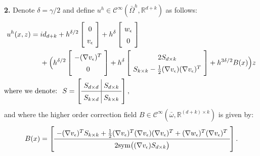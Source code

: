 \documentclass[reqno,twoside,11pt]{amsart}
\newcommand{\sym}{\mathrm{sym}}
\newcommand{\R}{\mathbb{R}}
\numberwithin{equation}{section}
\theoremstyle{plain}
\theoremstyle{definition}
\begin{document}
\medskip

{\bf 2.} Denote $\delta=\gamma/2$ and define $u^h\in \mathcal{C}^\infty(\bar \Omega^h,\R^{d+k})$ as follows: 
\begin{equation*}\label{recseq0}
\arraycolsep=3.4pt\def\arraystretch{1.4}
\begin{split}
u^h(x,z) = \; &  id_{d+k} + h^{\delta/2}\left[\begin{array}{c} 0\\
    v_\epsilon\end{array}\right] + h^{\delta}\left[\begin{array}{c} w_\epsilon\\ 0\end{array}\right] 
\\ & + \Big(h^{\delta/2} \left[\begin{array}{c} -(\nabla v_\epsilon)^T\\ 0\end{array}\right]
+ h^{\delta} \left[\begin{array}{c} 2 S_{d\times k}\\ S_{k\times
      k}-\frac{1}{2}(\nabla v_\epsilon)(\nabla v_\epsilon)^T\end{array}\right] +h^{3\delta/2} B(x)\Big)z
\\ & \hspace{-1.8cm} \mbox{where we denote: }\; 
S=\left[\begin{array}{c|c} S_{d\times  d} & S_{d\times k} 
    \\ \hline S_{k\times d} & S_{k\times k}\end{array}\right],
\end{split}
\end{equation*}
and where the higher order correction field $B\in\mathcal{C}^\infty (\bar\omega, \R^{(d+k)\times k})$ is given by:
$$\arraycolsep=3.4pt\def\arraystretch{1.4} 
B(x) = \left[\begin{array}{c} -(\nabla v_\epsilon)^TS_{k\times k}+\frac{1}{2}(\nabla
v_\epsilon)^T(\nabla v_\epsilon)(\nabla v_\epsilon)^T + (\nabla w_\epsilon)^T(\nabla
v_\epsilon)^T\\  \hline 2\sym \big((\nabla v_\epsilon) S_{d\times k}\big)
\end{array}\right].$$
\end{document}
